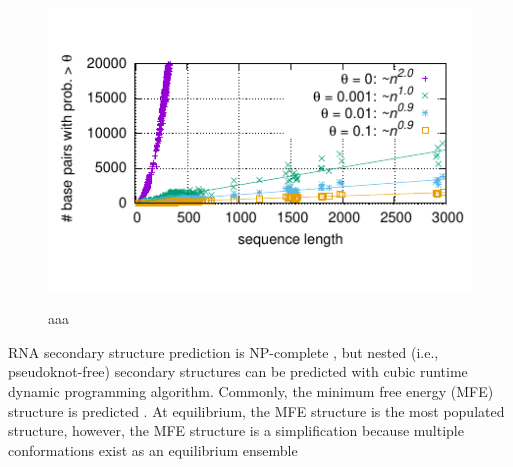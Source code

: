 \begin{figure}[h]
\center
\includegraphics[width=.42\textwidth]{figs/Vienna_RNAfold_num_pij_curves.pdf}\\
\caption{
aaa
\label{bp-number}}
\end{figure}

RNA secondary structure prediction is NP-complete \cite{Pedersen+:2000},
but nested (i.e., pseudoknot-free) secondary structures can be predicted with
cubic runtime dynamic programming algorithm. 
Commonly, the minimum free energy (MFE) 
structure is predicted \cite{nussinov+jacobson:1980, zuker+stiegler:1981}.
At equilibrium, the MFE structure is the most populated structure, 
however, 
the MFE structure is a simplification because 
multiple conformations exist 
as an equilibrium ensemble 
